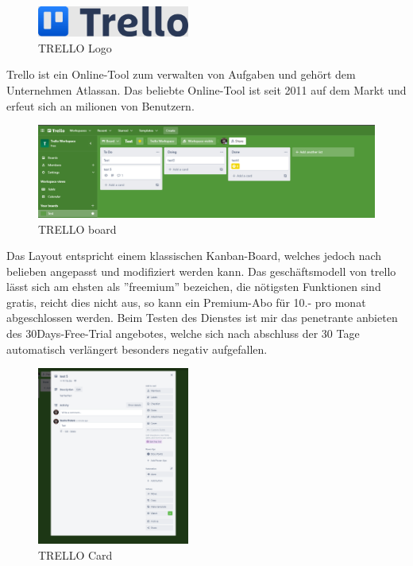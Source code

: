 
\begin{figure}[H]
    \begin{center}
        \includegraphics[width=5cm]{../content/images/Trello/TrelloLogo.png}
        \caption{TRELLO Logo}
    \end{center}
\end{figure}

Trello ist ein Online-Tool zum verwalten von Aufgaben und gehört dem Unternehmen Atlassan. 
Das beliebte Online-Tool ist seit 2011 auf dem Markt und erfeut sich an milionen von Benutzern.


\begin{figure}[H]
    \begin{center}
        \includegraphics[width=16cm]{../content/images/Trello/TrelloBoard.png}
        \caption{TRELLO board}
    \end{center}
\end{figure}

Das Layout entspricht einem klassischen Kanban-Board, welches jedoch nach belieben angepasst und
modifiziert werden kann. Das geschäftsmodell von trello lässt sich am ehsten als ''freemium'' bezeichen, die nötigsten Funktionen
sind gratis, reicht dies nicht aus, so kann ein Premium-Abo für 10.- pro monat abgeschlossen werden.
Beim Testen des Dienstes ist mir das penetrante anbieten des 30Days-Free-Trial angebotes, welche sich nach abschluss der 30 Tage automatisch verlängert
besonders negativ aufgefallen.\\
\space
\begin{figure}
    \begin{center}
        \includegraphics[width=5cm]{../content/images/Trello/TrelloCard.png}
        \caption{TRELLO Card}
    \end{center}
\end{figure}

